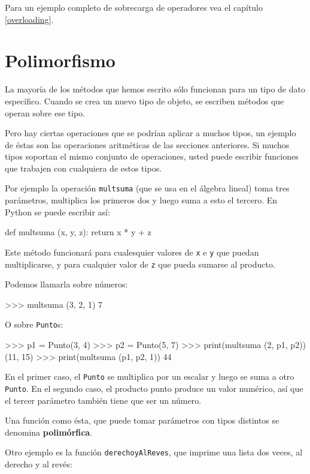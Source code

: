Para un ejemplo completo de sobrecarga de operadores vea el capítulo
\ref{overloading}.

\section{Polimorfismo}


La mayoría de los métodos que hemos escrito sólo funcionan para un
tipo de dato específico. Cuando se crea un nuevo tipo de objeto, se
escriben métodos que operan sobre ese tipo.

Pero hay ciertas operaciones que se podrían aplicar a muchos tipos,
un ejemplo de éstas son las operaciones aritméticas de las secciones
anteriores. Si muchos tipos soportan el mismo conjunto de operaciones,
usted puede escribir funciones que trabajen con cualquiera de estos
tipos.

Por ejemplo la operación \texttt{multsuma} (que se usa en el álgebra
lineal) toma tres parámetros, multiplica los primeros dos y luego
suma a esto el tercero. En Python se puede escribir así:

\begin{pythoncode}
def multsuma (x, y, z):
  return x * y + z
\end{pythoncode}
 Este método funcionará para cualesquier valores de \texttt{x} e \texttt{y}
que puedan multiplicarse, y para cualquier valor de \texttt{z} que
pueda sumarse al producto.

Podemos llamarla sobre números:

\begin{pyconcode}
>>> multsuma (3, 2, 1)
7
\end{pyconcode}
 O sobre \texttt{Punto}s:
\begin{pyconcode}
>>> p1 = Punto(3, 4)
>>> p2 = Punto(5, 7)
>>> print(multsuma (2, p1, p2))
(11, 15)
>>> print(multsuma (p1, p2, 1))
44
\end{pyconcode}

En el primer caso, el \texttt{Punto} se multiplica por un escalar
y luego se suma a otro \texttt{Punto}. En el segundo caso, el producto
punto produce un valor numérico, así que el tercer parámetro también
tiene que ser un número.

Una función como ésta, que puede tomar parámetros con tipos distintos
se denomina \textbf{polimórfica}.

Otro ejemplo es la función \texttt{derechoyAlReves}, que imprime una
lista dos veces, al derecho y al revés:

